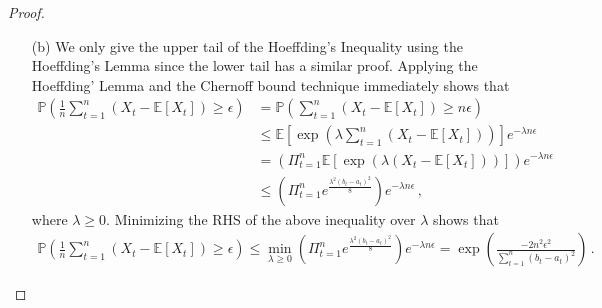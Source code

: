\begin{proof}
\begin{enumerate}
	\item[(b)]  We only give the upper tail of the Hoeffding's Inequality using the Hoeffding's Lemma since the lower tail has a similar proof. Applying the Hoeffding' Lemma and the Chernoff bound technique immediately
	shows that
	\begin{align*}
		\mathbb{P}\left(\frac{1}{n}\sum^n_{t=1}(X_t -\mathbb{E}[X_t])\geq\epsilon\right)&=\mathbb{P}\left(\sum^n_{t=1}(X_t-\mathbb{E}[X_t])\geq n\epsilon \right)\\
		&\leq\mathbb{E}\left[\exp\left(\lambda\sum^n_{t=1}(X_t-\mathbb{E}[X_t]) \right) \right]e^{-\lambda n\epsilon}\\
		&=\left(\Pi^n_{t=1}\mathbb{E}[\exp\left(\lambda(X_t-\mathbb{E}[X_t])\right)] \right)e^{-\lambda n\epsilon}\\
		&\leq\left(\Pi^n_{t=1}e^{\frac{\lambda^2(b_t-a_t)^2}{8}} \right)e^{-\lambda n\epsilon}\,,
	\end{align*}
	where $\lambda\geq0$. Minimizing the RHS of the above inequality over $\lambda$ shows that
	\begin{align*}
		\mathbb{P}\left(\frac{1}{n}\sum^n_{t=1}(X_t -\mathbb{E}[X_t])\geq\epsilon\right)\leq \min_{\lambda\geq0}\left(\Pi^n_{t=1}e^{\frac{\lambda^2(b_t-a_t)^2}{8}} \right)e^{-\lambda n\epsilon} =\exp\left(\frac{-2n^2\epsilon^2}{\sum^n_{t=1}(b_t-a_t)^2}\right)\,.
	\end{align*}
\end{enumerate}
\end{proof}













